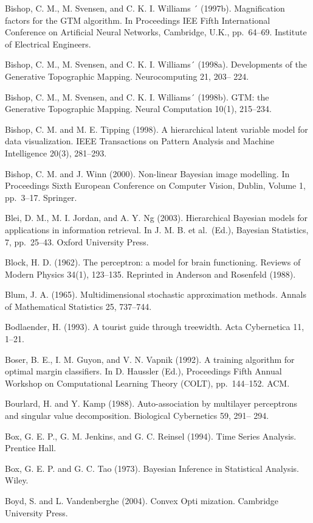 \documentclass[
  10
]{article}
\begin{document}
Bishop, C. M., M. Svensen, and C. K. I. Williams ´ (1997b).
Magnification factors for the GTM algorithm. In Proceedings IEE Fifth
International Conference on Artificial Neural Networks, Cambridge, U.K.,
pp.~64--69. Institute of Electrical Engineers.

Bishop, C. M., M. Svensen, and C. K. I. Williams´ (1998a). Developments
of the Generative Topographic Mapping. Neurocomputing 21, 203-- 224.

Bishop, C. M., M. Svensen, and C. K. I. Williams´ (1998b). GTM: the
Generative Topographic Mapping. Neural Computation 10(1), 215--234.

Bishop, C. M. and M. E. Tipping (1998). A hierarchical latent variable
model for data visualization. IEEE Transactions on Pattern Analysis and
Machine Intelligence 20(3), 281--293.

Bishop, C. M. and J. Winn (2000). Non-linear Bayesian image modelling.
In Proceedings Sixth European Conference on Computer Vision, Dublin,
Volume 1, pp.~3--17. Springer.

Blei, D. M., M. I. Jordan, and A. Y. Ng (2003). Hierarchical Bayesian
models for applications in information retrieval. In J. M. B. et
al.~(Ed.), Bayesian Statistics, 7, pp.~25--43. Oxford University Press.

Block, H. D. (1962). The perceptron: a model for brain functioning.
Reviews of Modern Physics 34(1), 123--135. Reprinted in Anderson and
Rosenfeld (1988).

Blum, J. A. (1965). Multidimensional stochastic approximation methods.
Annals of Mathematical Statistics 25, 737--744.

Bodlaender, H. (1993). A tourist guide through treewidth. Acta
Cybernetica 11, 1--21.

Boser, B. E., I. M. Guyon, and V. N. Vapnik (1992). A training algorithm
for optimal margin classifiers. In D. Haussler (Ed.), Proceedings Fifth
Annual Workshop on Computational Learning Theory (COLT), pp.~144--152.
ACM.

Bourlard, H. and Y. Kamp (1988). Auto-association by multilayer
perceptrons and singular value decomposition. Biological Cybernetics 59,
291-- 294.

Box, G. E. P., G. M. Jenkins, and G. C. Reinsel (1994). Time Series
Analysis. Prentice Hall.

Box, G. E. P. and G. C. Tao (1973). Bayesian Inference in Statistical
Analysis. Wiley.

Boyd, S. and L. Vandenberghe (2004). Convex Opti mization. Cambridge
University Press.
\end{document}
